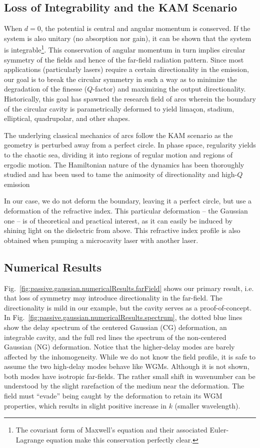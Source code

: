\subsection{Loss of Integrability and the KAM Scenario}
When $d=0$, the potential is central and angular momentum is 
conserved. If the system is also unitary
(no absorption nor gain), it can be shown that the system is
integrable\footnote{The covariant form of Maxwell's equation and their
associated Euler-Lagrange equation make this conservation perfectly clear.}. 
This conservation of angular momentum in turn
implies circular symmetry of the fields and hence of the 
far-field radiation pattern. Since most applications (particularly lasers)
require a certain directionality in the emission, our goal is to break 
the circular symmetry in such a way as to minimize the degradation of the
finesse ($Q$-factor) and maximizing the output directionality. Historically, 
this goal has spawned the research field of \glspl{arc} wherein the boundary
of the circular cavity is parametrically deformed to yield limaçon, stadium, 
elliptical, quadrupolar, and other shapes. 

The underlying classical mechanics of \glspl{arc} follow the KAM scenario 
as the geometry is perturbed away from a perfect circle. In phase space, 
regularity yields to the chaotic sea, dividing it into regions of regular
motion and regions of ergodic motion. The Hamiltonian nature of the 
dynamics has been thoroughly studied and has been used to tame the 
animosity of directionality and high-$Q$ emission \cite{KWA2013,KIM2013}

In our case, we do not deform the boundary, leaving it a perfect circle, 
but use a deformation of the refractive index. This particular deformation
-- the Gaussian one -- 
is of theoretical and practical interest, as it can easily be induced
by shining light on the dielectric from above. This refractive
index profile is also obtained when pumping a microcavity laser
with another laser.

\subsection{Numerical Results}
Fig.~\ref{fig:passive.gaussian.numericalResults.farField} shows our primary
result, i.e. that loss of symmetry may introduce directionality
in the far-field. The directionality is mild in our example, but the 
cavity serves as a proof-of-concept. In Fig.~\ref{fig:passive.gaussian.numericalResults.spectrum}, 
the dotted blue lines show the delay spectrum of the centered Gaussian (CG) deformation, 
an integrable cavity, and the full red lines the spectrum of the non-centered Gaussian
(NG) deformation. Notice that the higher-delay modes are barely affected by 
the inhomogeneity. While we do not know the field profile, 
it is safe to assume the two high-delay modes behave like WGMs. Although it is not shown, 
both modes have isotropic far-fields. The rather small shift in wavenumber can be
understood by the slight rarefaction of the medium near the deformation. 
The field must ``evade'' being caught by the deformation to retain
its WGM properties, which results in slight positive increase in $k$ (smaller wavelength). 

